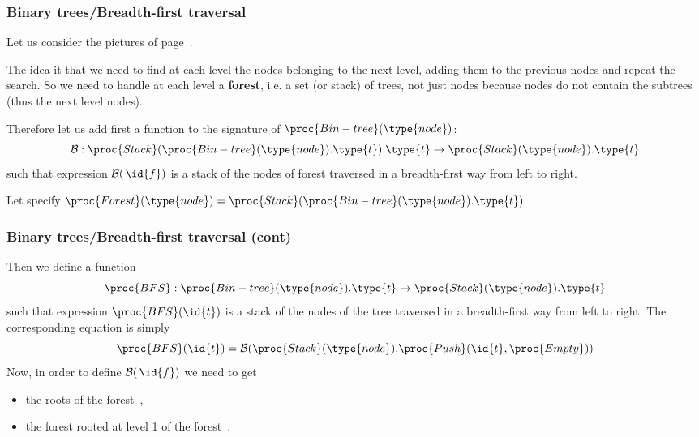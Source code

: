 %
\begin{frame}
\frametitle{Binary trees/Breadth-first traversal}

Let us consider the pictures of
page~\pageref{breadth_first_pictures}. 

\bigskip

The idea it that we need to find at each level the nodes belonging to
the next level, adding them to the previous nodes and repeat the
search. So we need to handle at each level a \textbf{forest}, i.e. a
set (or stack) of trees, not just nodes because nodes do not contain
the subtrees (thus the next level nodes).

\bigskip

Therefore let us add first a function to the signature of
\(\proc{Bin-tree}(\type{node})\):
\[
{\cal B} :
\proc{Stack}(\proc{Bin-tree}(\type{node}).\type{t}).\type{t}
\rightarrow \proc{Stack}(\type{node}).\type{t}
\]
such that expression \({\cal B}(\,\id{f})\) is a stack of the
nodes of forest  traversed in a breadth-first way from left to
right.

\bigskip

Let specify \(\proc{Forest}(\type{node}) = \proc{Stack}
(\proc{Bin-tree}(\type{node}).\type{t})\)

\end{frame}

%
\begin{frame}
\frametitle{Binary trees/Breadth-first traversal (cont)}
\label{bfs}

Then we define a function 
\[\proc{BFS} : \proc{Bin-tree}(\type{node}).\type{t} \rightarrow
\proc{Stack}(\type{node}).\type{t}
\]
such that expression \(\proc{BFS}(\id{t})\) is a stack of the nodes of
the tree  traversed in a breadth-first way from left to
right. The corresponding equation is simply
\[
\proc{BFS} (\id{t}) = {\cal B}
(\proc{Stack}(\type{node}).\proc{Push} (\id{t}, \proc{Empty}))
\]
Now, in order to define \({\cal B} (\,\id{f})\) we need to get
\begin{itemize}

  \item the roots of the forest \,,

  \item the forest rooted at level 1 of the forest \,.

\end{itemize}

\end{frame}


